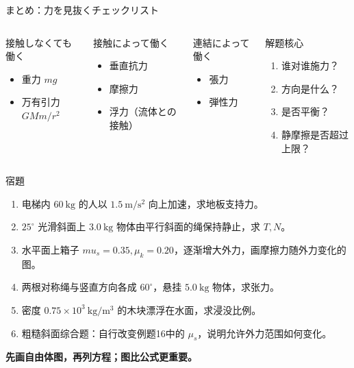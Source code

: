 \documentclass[notheorems,aspectratio=169]{beamer}
\newcommand{\jp}[1]{\textbf{\color{JapanBlue}#1}}
\begin{document}
\begin{frame}{まとめ：力を見抜くチェックリスト}
\begin{columns}[T]
\begin{block}{接触しなくても働く}
\begin{itemize}
  \item 重力 $mg$
  \item 万有引力 $GMm/r^2$
\end{itemize}
\end{block}
\begin{block}{接触によって働く}
\begin{itemize}
  \item 垂直抗力
  \item 摩擦力
  \item 浮力（流体との接触）
\end{itemize}
\end{block}
\begin{alertblock}{連結によって働く}
\begin{itemize}
  \item 張力
  \item 弾性力
\end{itemize}
\end{alertblock}
\begin{exampleblock}{解题核心}
\begin{enumerate}
  \item 谁对谁施力？
  \item 方向是什么？
  \item 是否平衡？
  \item 静摩擦是否超过上限？
\end{enumerate}
\end{exampleblock}
\end{columns}
\end{frame}

\begin{frame}{宿題}
\small
\begin{enumerate}
  \item 电梯内 $60\ \mathrm{kg}$ 的人以 $1.5\ \mathrm{m/s^2}$ 向上加速，求地板支持力。
  \item $25^\circ$ 光滑斜面上 $3.0\ \mathrm{kg}$ 物体由平行斜面的绳保持静止，求 $T,N$。
  \item 水平面上箱子 $mu_s=0.35,\mu_k=0.20$，逐渐增大外力，画摩擦力随外力变化的图。
  \item 两根对称绳与竖直方向各成 $60^\circ$，悬挂 $5.0\ \mathrm{kg}$ 物体，求张力。
  \item 密度 $0.75\times10^3\ \mathrm{kg/m^3}$ 的木块漂浮在水面，求浸没比例。
  \item 粗糙斜面综合题：自行改变例题16中的 $\mu_s$，说明允许外力范围如何变化。
\end{enumerate}
\vfill
\centering
\jp{先画自由体图，再列方程；图比公式更重要。}
\end{frame}
\end{document}
